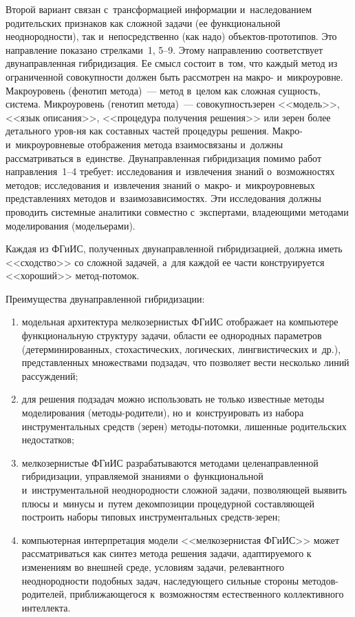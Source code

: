 \begin{multicols}{2}
  Второй вариант связан с~трансформацией информации и~наследованием родительских 
признаков как сложной задачи (ее функциональной неоднородности), так и~непосредственно 
(как надо) объ\-ек\-тов-про\-то\-ти\-пов. Это направление показано стрелками~1, 5--9. 
Этому 
направлению соответствует двунаправленная гибридизация. Ее смысл состоит в~том, что 
каждый метод из ограниченной совокупности должен быть рассмотрен на макро- 
и~микроуровне. Макроуровень (фенотип метода)~--- 
метод в~целом как сложная сущность, 
система. Мик\-ро\-уро\-вень (генотип метода)~--- совокупность\linebreak зерен <<модель>>, <<язык 
описания>>, <<процедура получения решения>> или зерен более детального уров-\linebreak ня как 
составных частей процедуры решения. Макро- и~мик\-ро\-уров\-не\-вые отображения метода 
взаимосвязаны и~должны рассматриваться в~единстве. Двунаправленная гибридизация 
помимо работ направления~1--4 требует: исследования и~извлечения знаний о~возможностях 
методов;\linebreak 
исследования и~извлечения знаний о~мак\-ро- и~мик\-ро\-уровневых представлениях 
методов и~взаимозависимостях. Эти исследования должны проводить системные аналитики 
совместно с~экспертами, владеющими методами моделирования (модельерами).

  Каждая из ФГиИС, полученных двунаправленной гибридизацией, должна иметь 
<<сходство>> со сложной задачей, а~для каждой ее части конструируется <<хороший>>  
ме\-тод-по\-томок.

  Преимущества двунаправленной гибридизации:
\begin{enumerate}[(1)]
\item модельная архитектура мелкозернистых \mbox{ФГиИС} отображает на компьютере 
функциональную структуру задачи, области ее однородных параметров 
(детерминированных, стохастических, логических, лингвистических и~др.), представленных 
множествами подзадач, что позволяет вести несколько линий рассуждений;\\[-15pt]
\item для решения подзадач можно использовать не только известные методы моделирования 
(ме\-то\-ды-ро\-ди\-те\-ли), но и~конструировать из набора инструментальных средств (зерен) 
ме\-то\-ды-по\-том\-ки, лишенные родительских недостатков;\\[-15pt] 
\item мелкозернистые ФГиИС разрабатываются методами целенаправленной гибридизации, 
управ\-ля\-емой знаниями о~функциональной и~инструментальной неоднородности сложной 
задачи, позволяющей выявить плюсы и~минусы и~путем декомпозиции процедурной 
со\-став\-ля\-ющей построить наборы типовых инструментальных средств-зе\-рен;\\[-15pt]
\item компьютерная интерпретация модели <<мелкозернистая ФГиИС>> 
может рассматриваться как синтез метода решения задачи, адаптируемого к изменениям во 
внешней среде, условиям задачи, релевантного неоднородности подобных задач, 
наследующего сильные стороны ме\-то\-дов-ро\-ди\-те\-лей, при\-бли\-жа\-юще\-го\-ся к~возможностям 
естественного коллективного интеллекта.
\end{enumerate}


\end{multicols}
